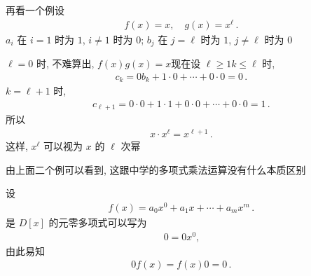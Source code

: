 \begin{example}
    再看一个例\period 设
    \begin{align*}
        f(x) = x, \quad g(x) = x^\ell \period
    \end{align*}
    $a_i$ 在 $i=1$ 时为 $1$, $i \neq 1$ 时为 $0$; $b_j$ 在 $j=\ell$ 时为 $1$, $j \neq \ell$ 时为 $0$\period

    $\ell = 0$ 时, 不难算出, $f(x)g(x) = x$\period 现在设 $\ell \geq 1$\period $k \leq \ell$ 时,
    \begin{align*}
        c_k = 0 b_k + 1 \cdot 0 + \cdots + 0 \cdot 0 = 0 \period
    \end{align*}
    $k = \ell + 1$ 时,
    \begin{align*}
        c_{\ell + 1} = 0 \cdot 0 + 1 \cdot 1 + 0 \cdot 0 + \cdots + 0 \cdot 0 = 1 \period
    \end{align*}
    所以
    \begin{align*}
        x \cdot x^{\ell} = x^{\ell+1} \period
    \end{align*}
    这样, $x^\ell$ 可以视为 $x$ 的 $\ell$ 次幂\period
\end{example}

\begin{remark}
    由上面二个例可以看到, 这跟中学的多项式乘法运算没有什么本质区别\period
\end{remark}

\begin{example}
    设
    \begin{align*}
        f(x) = a_0 x^0 + a_1 x + \cdots + a_m x^m \period
    \end{align*}
    是 $D[x]$ 的元\period 零多项式可以写为
    \begin{align*}
        0 = 0x^0,
    \end{align*}
    由此易知
    \begin{align*}
        0f(x) = f(x)0 = 0\period
    \end{align*}
\end{example}

